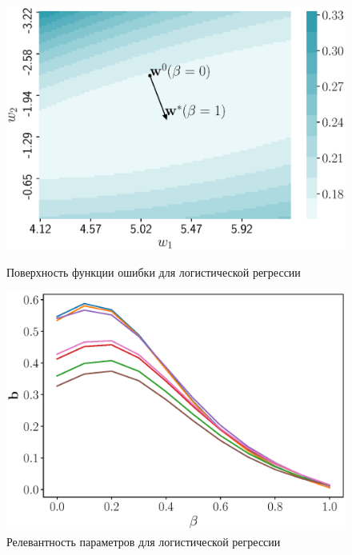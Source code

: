 \begin{figure}[h]
	\centering
	\begin{minipage}{.47\textwidth}
		\centering
		\includegraphics[width=\linewidth]{figs/ch4/log_reg_error}
		\caption{Поверхность функции ошибки для логистической регрессии}
		\label{ch4:fig:log_reg_error}
	\end{minipage}%
	\begin{minipage}{.47\textwidth}
		\centering
		\includegraphics[width=\linewidth]{figs/ch4/log_reg_b_wrt_beta}
		\caption{Релевантность параметров для логистической регрессии}
		\label{ch4:fig:log_reg_b_wrt_beta}
	\end{minipage}
\end{figure}

